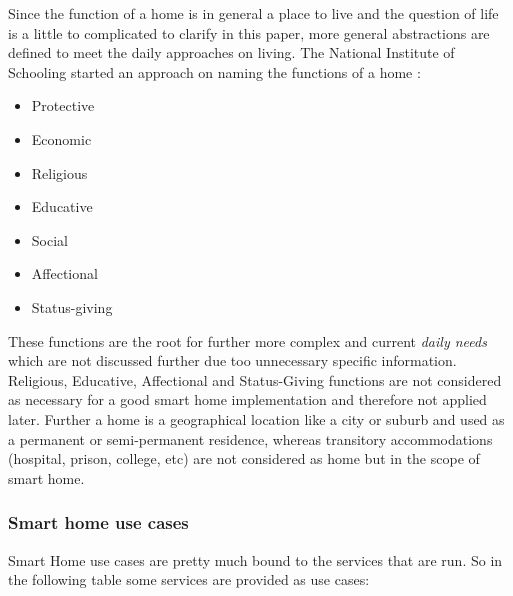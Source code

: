 			\pagebreak

			Since the function of a home is in general a place to live and the question of life is a little to complicated to clarify in this paper, more general abstractions are defined to meet the daily approaches on living. The National Institute of Schooling started an approach on naming the functions of a home \parencite{homeFunctionality}:

			\begin{itemize}
				\item Protective
				\item Economic
				\item Religious
				\item Educative
				\item Social
				\item Affectional
				\item Status-giving
			\end{itemize}

			These functions are the root for further more complex and current \textit{daily needs} which are not discussed further due too unnecessary specific information. Religious, Educative, Affectional and Status-Giving functions are not considered as necessary for a good smart home implementation and therefore not applied later. Further a home is a geographical location like a city or suburb and used as a permanent or semi-permanent residence, whereas transitory accommodations (hospital, prison, college, etc) are not considered as home but in the scope of smart home.\\



		\subsubsection{Smart home use cases}\label{posInCS}
		Smart Home use cases are pretty much bound to the services that are run. So in the following table some services are provided as use cases:

